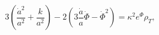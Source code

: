 \begin{equation}
3\left(\frac{\dot a^2}{a^2}+\frac{k}{a^2}\right)
-2\left(3\frac{\dot a}{a}\dot\Phi-\dot\Phi^2\right) = 
\kappa^2 e^\Phi \rho_{T},
\label{metric3-1}
\end{equation}

